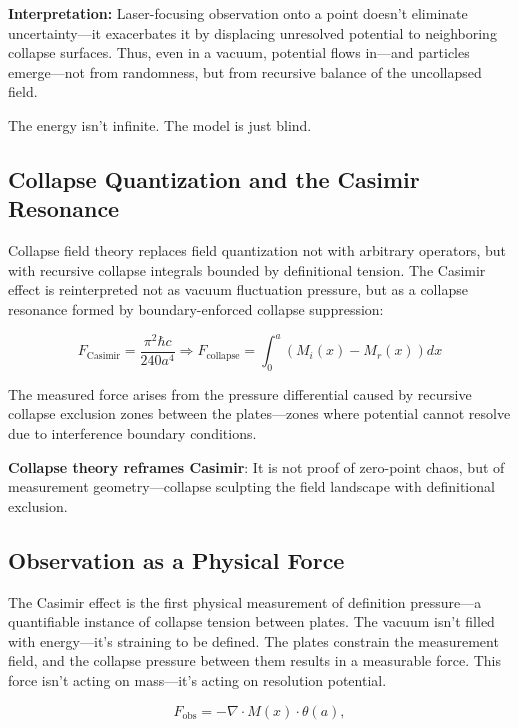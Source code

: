 \textbf{Interpretation:} Laser-focusing observation onto a point doesn’t eliminate uncertainty—it exacerbates it by displacing unresolved potential to neighboring collapse surfaces. Thus, even in a vacuum, potential flows in—and particles emerge—not from randomness, but from recursive balance of the uncollapsed field.

The energy isn’t infinite. The model is just blind.

\subsection*{Collapse Quantization and the Casimir Resonance}

Collapse field theory replaces field quantization not with arbitrary operators, but with recursive collapse integrals bounded by definitional tension. The Casimir effect is reinterpreted not as vacuum fluctuation pressure, but as a collapse resonance formed by boundary-enforced collapse suppression:

\begin{equation}
F_{\text{Casimir}} = \frac{\pi^2 \hbar c}{240 a^4} \Rightarrow F_{\text{collapse}} = \int_{0}^{a} \left( M_i(x) - M_r(x) \right) dx
\end{equation}

The measured force arises from the pressure differential caused by recursive collapse exclusion zones between the plates—zones where potential cannot resolve due to interference boundary conditions.

\textbf{Collapse theory reframes Casimir}: It is not proof of zero-point chaos, but of measurement geometry—collapse sculpting the field landscape with definitional exclusion.

\subsection*{Observation as a Physical Force}

The Casimir effect is the first physical measurement of definition pressure—a quantifiable instance of collapse tension between plates. The vacuum isn’t filled with energy—it’s straining to be defined. The plates constrain the measurement field, and the collapse pressure between them results in a measurable force. This force isn’t acting on mass—it’s acting on resolution potential.

\begin{equation}
F_{\text{obs}} = -\nabla \cdot M(x) \cdot \theta(a),
\end{equation}

